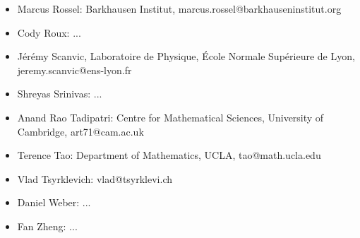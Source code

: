 \begin{itemize}
    \item Marcus Rossel: Barkhausen Institut, marcus.rossel@barkhauseninstitut.org
    \item Cody Roux: ...
    \item J\'er\'emy Scanvic, Laboratoire de Physique, École Normale Supérieure de Lyon, jeremy.scanvic@ens-lyon.fr
    \item Shreyas Srinivas: ...
    \item Anand Rao Tadipatri: Centre for Mathematical Sciences, University of Cambridge, art71@cam.ac.uk
    \item Terence Tao: Department of Mathematics, UCLA, tao@math.ucla.edu
    \item Vlad Tsyrklevich: vlad@tsyrklevi.ch
    \item Daniel Weber: ...
    \item Fan Zheng: ...
\end{itemize}
